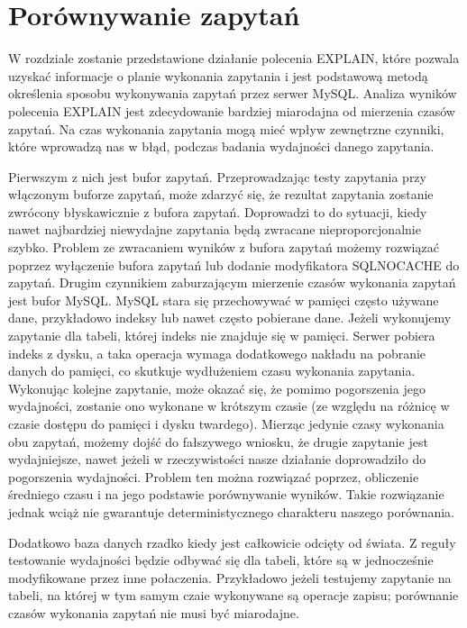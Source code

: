 \section{Porównywanie zapytań}
W rozdziale zostanie przedstawione działanie polecenia EXPLAIN, które pozwala uzyskać informacje o planie wykonania zapytania i jest podstawową metodą określenia sposobu wykonywania zapytań przez serwer MySQL. Analiza wyników polecenia EXPLAIN jest zdecydowanie bardziej miarodajna od mierzenia czasów zapytań. Na czas wykonania zapytania mogą mieć wpływ zewnętrzne czynniki, które wprowadzą nas w błąd, podczas badania wydajności danego zapytania. 

Pierwszym z nich jest bufor zapytań. Przeprowadzając testy zapytania przy włączonym buforze zapytań, może zdarzyć się, że rezultat zapytania zostanie zwrócony błyskawicznie z bufora zapytań. Doprowadzi to do sytuacji, kiedy nawet najbardziej niewydajne zapytania będą zwracane nieproporcjonalnie szybko. Problem ze zwracaniem wyników z bufora zapytań możemy rozwiązać poprzez wyłączenie bufora zapytań lub dodanie modyfikatora SQL\textunderscore NO\textunderscore CACHE do zapytań. 
Drugim czynnikiem zaburzającym mierzenie czasów wykonania zapytań jest bufor MySQL. MySQL stara się przechowywać w pamięci często używane dane, przykładowo indeksy lub nawet często pobierane dane. Jeżeli wykonujemy zapytanie dla tabeli, której indeks nie znajduje się w pamięci. Serwer pobiera indeks z dysku, a taka operacja wymaga dodatkowego nakładu na pobranie danych do pamięci, co skutkuje wydłużeniem czasu wykonania zapytania. Wykonując kolejne zapytanie, może okazać się, że pomimo pogorszenia jego wydajności, zostanie ono wykonane w krótszym czasie (ze względu na różnicę w czasie dostępu do pamięci i dysku twardego). Mierząc jedynie czasy wykonania obu zapytań, możemy dojść do fałszywego wniosku, że drugie zapytanie jest wydajniejsze, nawet jeżeli w rzeczywistości nasze działanie doprowadziło do pogorszenia wydajności. Problem ten można rozwiązać poprzez, obliczenie średniego czasu i na jego podstawie porównywanie wyników. Takie rozwiązanie jednak wciąż nie gwarantuje deterministycznego charakteru naszego porównania.

Dodatkowo baza danych rzadko kiedy jest całkowicie odcięty od świata. Z reguły testowanie wydajności będzie odbywać się dla tabeli, które są w jednocześnie modyfikowane przez inne połaczenia. Przykładowo jeżeli testujemy zapytanie na tabeli, na której w tym samym czaie wykonywane są operacje zapisu; porównanie czasów wykonania zapytań nie musi być miarodajne.

